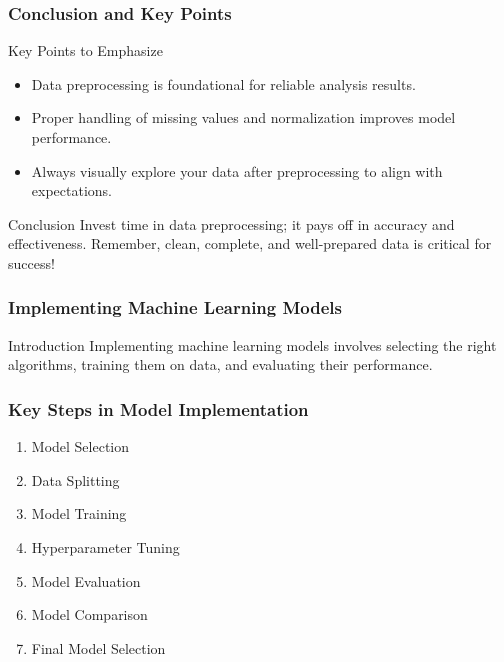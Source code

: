\documentclass[aspectratio=169]{beamer}
\begin{document}
\begin{frame}[fragile]
    \frametitle{Conclusion and Key Points}
    \begin{block}{Key Points to Emphasize}
        \begin{itemize}
            \item Data preprocessing is foundational for reliable analysis results.
            \item Proper handling of missing values and normalization improves model performance.
            \item Always visually explore your data after preprocessing to align with expectations.
        \end{itemize}
    \end{block}
    
    \begin{block}{Conclusion}
        Invest time in data preprocessing; it pays off in accuracy and effectiveness. 
        Remember, clean, complete, and well-prepared data is critical for success!
    \end{block}
\end{frame}

\begin{frame}
    \frametitle{Implementing Machine Learning Models}
    \begin{block}{Introduction}
        Implementing machine learning models involves selecting the right algorithms, training them on data, and evaluating their performance.
    \end{block}
\end{frame}

\begin{frame}
    \frametitle{Key Steps in Model Implementation}
    \begin{enumerate}
        \item Model Selection
        \item Data Splitting
        \item Model Training
        \item Hyperparameter Tuning
        \item Model Evaluation
        \item Model Comparison
        \item Final Model Selection
    \end{enumerate}
\end{frame}
\end{document}
